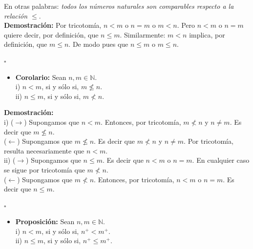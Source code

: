\documentclass[10 pt]{article}
\begin{document}
\Large{En otras palabras: \textit{todos los números naturales son comparables respecto a la relación $\leq$}.} \\

\Large{\textbf{Demostración:} Por tricotomía, $n<m$ o $n=m$ o $m<n$. Pero $n<m$ o $n=m$ quiere decir, por definición, que $n \leq m$. Similarmente: $m<n$ implica, por definición, que $m \leq n$. De modo pues que $n \leq m$ o $m \leq n$.} \\

\begin{flushright}
    $\square$
\end{flushright}

\begin{itemize}
    \item \Large{\textbf{Corolario:} Sean $n,m \in \mathbb N$. \\

    i) $n<m$, si y sólo si, $m \nleq n$. \\

    ii) $n \leq m$, si y sólo si, $m \nless n$.} \\
\end{itemize}

\Large{\textbf{Demostración:} \\

i) ($\rightarrow$) Supongamos que $n<m$. Entonces, por tricotomía, $m \nless n$ y $n \neq m$. Es decir que $m \nleq n$. \\

($\leftarrow$) Supongamos que $m \nleq n$. Es decir que $m \nless n$ y $n \neq m$. Por tricotomía, resulta necesariamente que $n<m$. \\

ii) ($\rightarrow$) Supongamos que $n \leq m$. Es decir que $n<m$ o $n=m$. En cualquier caso se sigue por tricotomía que $m \nless n$. \\

($\leftarrow$) Supongamos que $m \nless n$. Entonces, por tricotomía, $n<m$ o $n=m$. Es decir que $n \leq m$.} \\

\begin{flushright}
    $\square$
\end{flushright}

\begin{itemize}
    \item \Large{\textbf{Proposición:} Sean $n,m \in \mathbb N$. \\

    i) $n<m$, si y sólo si, $n^+<m^+$. \\

    ii) $n \leq m$, si y sólo si, $n^+ \leq m^+$.} \\
\end{itemize}
\end{document}
